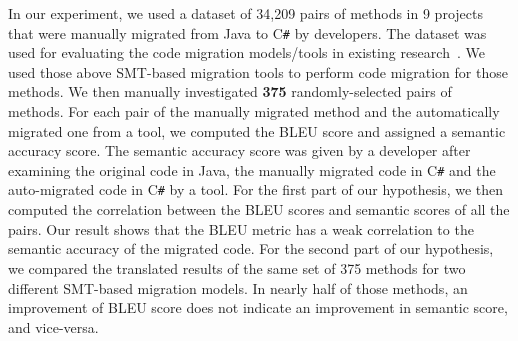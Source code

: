 %

In our experiment, we used a dataset of 34,209 pairs of methods
in 9 projects that were manually migrated from Java to
C\texttt{\#} by developers. The dataset was used for evaluating the
code migration models/tools in existing research~\cite{ase15}. We used
those above SMT-based migration tools to perform code migration for
those methods. We then manually investigated {\bf 375}
randomly-selected pairs of methods. For each pair of the manually
migrated method and the automatically migrated one from a tool, we
computed the BLEU score and assigned a semantic accuracy score. The
semantic accuracy score was given by a developer after examining the
original code in Java, the manually migrated code in C\texttt{\#} and
the auto-migrated code in C\texttt{\#} by a tool. For the first part
of our hypothesis, we then computed the correlation between the BLEU
scores and semantic scores of all the pairs. Our result shows that the
BLEU metric has a weak correlation to the semantic accuracy of the
migrated code. For the second part of our hypothesis, we compared the
translated results of the same set of 375 methods for two different
SMT-based migration models. In nearly half of those methods, an
improvement of BLEU score does not indicate an improvement in semantic
score, and vice-versa.

